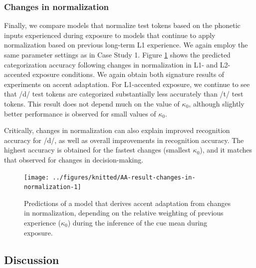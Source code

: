 \documentclass[
  11pt,
  english,
  man,floatsintext]{apa6}
\begin{document}
\hypertarget{changes-in-normalization-1}{%
\subsubsection{Changes in normalization}\label{changes-in-normalization-1}}

Finally, we compare models that normalize test tokens based on the phonetic inputs experienced during exposure to models that continue to apply normalization based on previous long-term L1 experience. We again employ the same parameter settings as in Case Study 1.
Figure \ref{fig:AA-result-changes-in-normalization} shows the predicted categorization accuracy following changes in normalization in L1- and L2-accented exposure conditions. We again obtain both signature results of experiments on accent adaptation. For L1-accented exposure, we continue to see that /d/ test tokens are categorized substantially less accurately than /t/ test tokens. This result does not depend much on the value of \(\kappa_0\), although slightly better performance is observed for small values of \(\kappa_0\).

Critically, changes in normalization can also explain improved recognition accuracy for /d/, as well as overall improvements in recognition accuracy. The highest accuracy is obtained for the fastest changes (smallest \(\kappa_0\)), and it matches that observed for changes in decision-making.



\begin{figure}

{\centering \texttt{[image: ../figures/knitted/AA-result-changes-in-normalization-1]} 

}

\caption{Predictions of a model that derives accent adaptation from changes in normalization, depending on the relative weighting of previous experience (\(\kappa_0\)) during the inference of the cue mean during exposure.}\label{fig:AA-result-changes-in-normalization}
\end{figure}

\hypertarget{discussion-1}{%
\subsection{Discussion}\label{discussion-1}}
\end{document}
